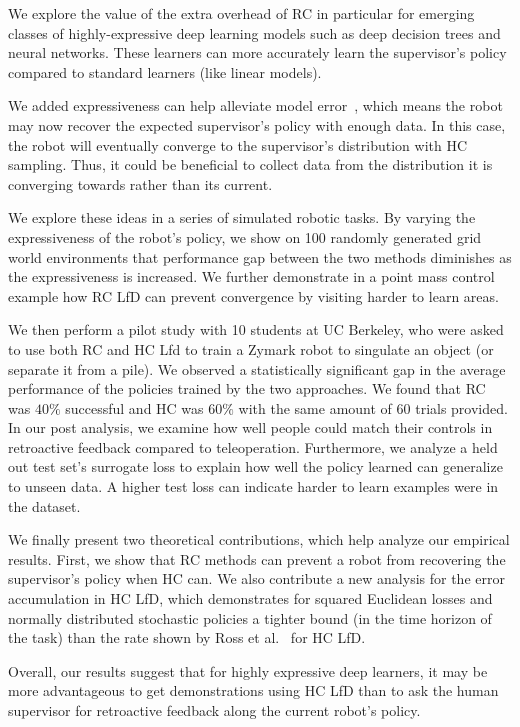 \documentclass[10pt, conference]{ieeeconf}      %
\begin{document}
We explore the value of the extra overhead of RC in particular for emerging classes of highly-expressive deep learning models such as deep decision trees and neural networks. These learners can more accurately learn the supervisor's policy compared to standard learners (like linear models). 

We  added expressiveness can help alleviate model error~\cite{vapnik1992principles}, which means the robot may now recover the expected supervisor's policy with enough data. In this case, the robot will eventually converge to the  supervisor's distribution with HC sampling. Thus,  it could be beneficial to collect data from the distribution it is converging towards rather than its current. 

We explore these ideas in a series of simulated robotic tasks. By varying the expressiveness of the robot's policy, we show on 100 randomly generated grid world environments that performance gap between the two methods diminishes as the expressiveness is increased. We further demonstrate in a point mass control example how RC LfD can prevent convergence by visiting harder to learn areas. 

We then perform a pilot study with 10 students at UC Berkeley, who were asked to use both RC and HC Lfd to train a Zymark robot to singulate an object (or separate it from a pile). We observed a statistically significant gap in the average performance of the policies trained by the two approaches. We found that RC was $40\%$ successful and HC was $60\%$ with the same amount of $60$ trials provided. In our post analysis, we examine how well people could match their controls in retroactive feedback compared to teleoperation. Furthermore, we analyze a held out test set's surrogate loss to explain how well the policy learned can generalize to unseen data. A higher test loss can indicate harder to learn examples were in the dataset. 

We finally present two theoretical contributions, which help analyze our empirical results. First, we show that RC methods can prevent a robot from recovering the supervisor's policy when HC can. We also contribute a new analysis for the error accumulation in HC LfD, which demonstrates for squared Euclidean losses and normally distributed stochastic policies a tighter bound (in the time horizon of the task) than the rate shown by Ross et al.~\cite{ross2010efficient} for HC LfD.

Overall, our results suggest that for highly expressive deep learners, it may be more advantageous to get demonstrations using HC LfD than to ask the human supervisor for retroactive feedback along the current robot's policy.
\end{document}

